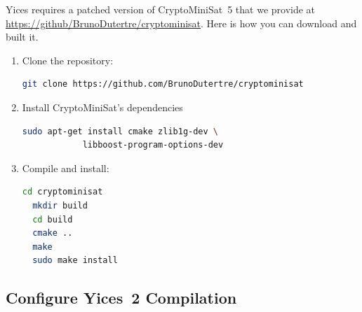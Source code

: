 \documentclass[11pt,twoside,fleqn,openright,titlepage]{cslreport}
\begin{document}
Yices requires a patched version of CryptoMiniSat~5 that we provide at
\url{https://github/BrunoDutertre/cryptominisat}. Here is how you can download and built it.
\begin{enumerate}
\item Clone the repository:
\begin{small}
\begin{lstlisting}[language=sh]
  git clone https://github.com/BrunoDutertre/cryptominisat
\end{lstlisting}
\end{small}
\item Install CryptoMiniSat's dependencies
\begin{small}
\begin{lstlisting}[language=sh]
  sudo apt-get install cmake zlib1g-dev \
            libboost-program-options-dev
\end{lstlisting}
\end{small}
\item Compile and install:
\begin{small}
\begin{lstlisting}[language=sh,deletekeywords={cd}]
  cd cryptominisat
  mkdir build
  cd build
  cmake ..
  make
  sudo make install
\end{lstlisting}
\end{small}
\end{enumerate}

\subsection*{Configure Yices~2 Compilation}
\end{document}
